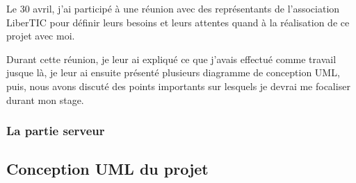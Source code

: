 Le 30 avril, j'ai participé à une réunion avec des représentants de l'association LiberTIC pour définir leurs besoins et leurs attentes quand à la réalisation de ce projet avec moi.

Durant cette réunion, je leur ai expliqué ce que j'avais effectué comme travail jusque là, je leur ai ensuite présenté plusieurs diagramme de conception UML, puis, nous avons discuté des points importants sur lesquels je devrai me focaliser durant mon stage.

\subsubsection{La partie serveur}

\subsection{Conception UML du projet}